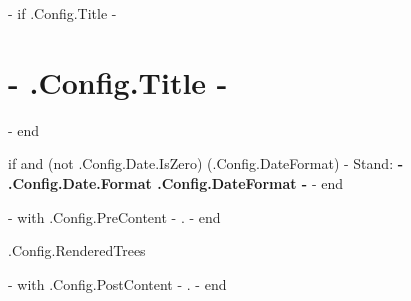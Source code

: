 \documentclass[10pt,paper=a4,ngerman,parskip,DIV=11,BCOR=0mm,%
{{ if .Config.DocumentOptions -}}
{{ .Config.DocumentOptions }}%
{{- end }}%
]{scrartcl}
\begin{document}
{{- if .Config.Title -}}
\section*{ {{- .Config.Title -}} }
{{- end }}

{{ if and (not .Config.Date.IsZero) (.Config.DateFormat) -}}
Stand: \textbf{ {{- .Config.Date.Format .Config.DateFormat -}} }
{{- end }}


{{- with .Config.PreContent -}}
{{ . }}
{{- end }}


{{ .Config.RenderedTrees }}


{{- with .Config.PostContent -}}
{{ . }}
{{- end }}
\end{document}
